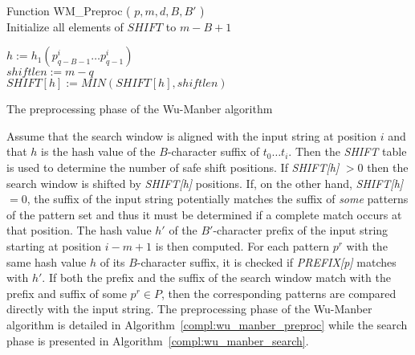 \documentclass{ws-ijait}
\begin{document}
\begin{algorithm}[h]

Function WM\_Preproc ( $p, m, d, B, B'$ )\\

Initialize all elements of $SHIFT$ to $m - B + 1$\\

 {

	 {
		
		$h := h_1(p^i_{q - B - 1}\ldots p^i_{q - 1})$\\
		
		$shiftlen := m - q$\\
			
		$SHIFT[h] := MIN( SHIFT[h], shiftlen )$\\
			
	}
}

\caption{The preprocessing phase of the Wu-Manber algorithm}
\label{compl:wu_manber_preproc}
\end{algorithm}

Assume that the search window is aligned with the input string at position $i$ and that $h$ is the hash value of the $B$-character suffix of $t_0\ldots t_i$. Then the \textit{SHIFT} table is used to determine the number of safe shift positions. If \textit{SHIFT[h]} $> 0$ then the search window is shifted by \textit{SHIFT[h]} positions. If, on the other hand, \textit{SHIFT[h]} $= 0$, the suffix of the input string potentially matches the suffix of \textit{some} patterns of the pattern set and thus it must be determined if a complete match occurs at that position. The hash value $h'$ of the $B'$-character prefix of the input string starting at position $i - m + 1$ is then computed. For each pattern $p^r$ with the same hash value $h$ of its $B$-character suffix, it is checked if \textit{PREFIX[p]} matches with $h'$. If both the prefix and the suffix of the search window match with the prefix and suffix of some $p^r \in P$, then the corresponding patterns are compared directly with the input string. The preprocessing phase of the Wu-Manber algorithm is detailed in Algorithm~\ref{compl:wu_manber_preproc} while the search phase is presented in Algorithm~\ref{compl:wu_manber_search}.
\end{document}
